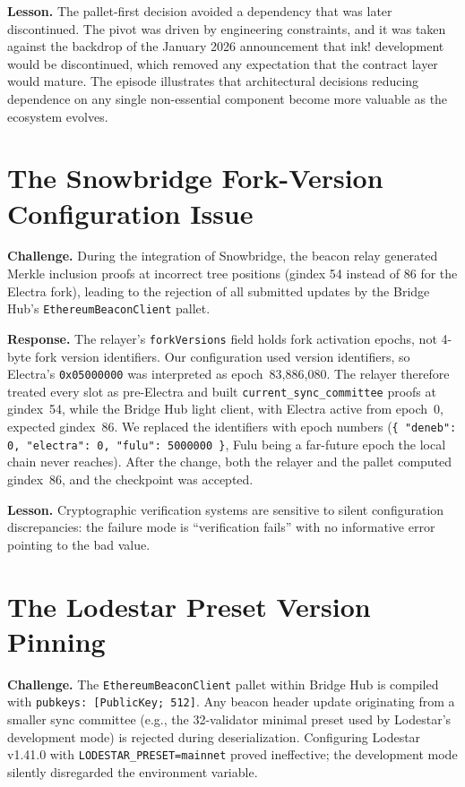 \textbf{Lesson.} The pallet-first decision avoided a dependency that was later discontinued. The pivot was driven by engineering constraints, and it was taken against the backdrop of the January 2026 announcement that ink! development would be discontinued, which removed any expectation that the contract layer would mature. The episode illustrates that architectural decisions reducing dependence on any single non-essential component become more valuable as the ecosystem evolves.

\section{The Snowbridge Fork-Version Configuration Issue}\label{sec:snowbridge-fork-version}

\textbf{Challenge.} During the integration of Snowbridge, the beacon relay generated Merkle inclusion proofs at incorrect tree positions (gindex 54 instead of 86 for the Electra fork), leading to the rejection of all submitted updates by the Bridge Hub's \texttt{EthereumBeaconClient} pallet.

\textbf{Response.} The relayer's \texttt{forkVersions} field holds fork activation epochs, not 4-byte fork version identifiers. Our configuration used version identifiers, so Electra's \texttt{0x05000000} was interpreted as epoch~83,886,080. The relayer therefore treated every slot as pre-Electra and built \texttt{current\_sync\_committee} proofs at gindex~54, while the Bridge Hub light client, with Electra active from epoch~0, expected gindex~86. We replaced the identifiers with epoch numbers (\texttt{\{ "deneb": 0, "electra": 0, "fulu": 5000000 \}}, Fulu being a far-future epoch the local chain never reaches). After the change, both the relayer and the pallet computed gindex~86, and the checkpoint was accepted.

\textbf{Lesson.} Cryptographic verification systems are sensitive to silent configuration discrepancies: the failure mode is ``verification fails'' with no informative error pointing to the bad value.

\section{The Lodestar Preset Version Pinning}\label{sec:lodestar-pinning}

\textbf{Challenge.} The \texttt{EthereumBeaconClient} pallet within Bridge Hub is compiled with \texttt{pubkeys: [PublicKey; 512]}. Any beacon header update originating from a smaller sync committee (e.g., the 32-validator minimal preset used by Lodestar's development mode) is rejected during deserialization. Configuring Lodestar v1.41.0 with \texttt{LODESTAR\_PRESET=mainnet} proved ineffective; the development mode silently disregarded the environment variable.


